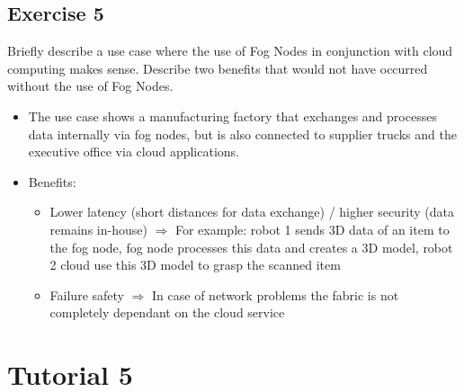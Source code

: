 \documentclass{article}
\begin{document}
\subsection{Exercise 5}
Briefly describe a use case where the use of Fog Nodes in conjunction with cloud computing makes sense. Describe two benefits that would not have occurred without the use of Fog Nodes.
\begin{itemize}
    \item The use case shows a manufacturing factory that exchanges and processes data internally via fog nodes, but is also connected to supplier trucks and the executive office via cloud applications.
    \item Benefits:
          \begin{itemize}
              \item Lower latency (short distances for data exchange) / higher security (data remains in-house) \(\Rightarrow\) For example: robot 1 sends 3D data of an item to the fog node, fog node processes this data and creates a 3D model, robot 2 cloud use this 3D model to grasp the scanned item
              \item Failure safety \(\Rightarrow\) In case of network problems the fabric is not completely dependant on the cloud service
          \end{itemize}
\end{itemize}
\section{Tutorial 5}
\end{document}
